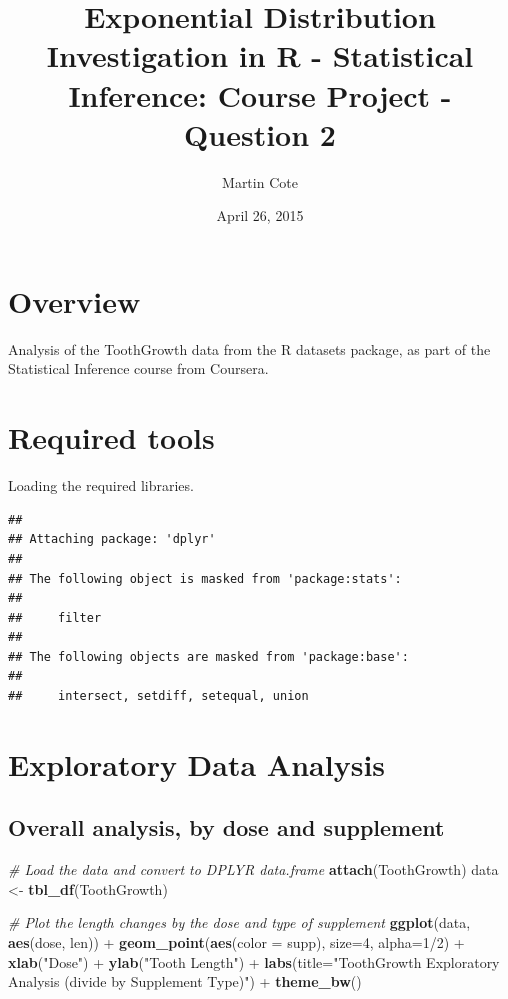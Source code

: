 \documentclass[]{article}
\title{Exponential Distribution Investigation in R - Statistical Inference:
Course Project - Question 2}
\author{Martin Cote}
\date{April 26, 2015}
\newenvironment{Shaded}{\begin{snugshade}}{\end{snugshade}}
\newcommand{\KeywordTok}[1]{\textcolor[rgb]{0.13,0.29,0.53}{\textbf{{#1}}}}
\newcommand{\DataTypeTok}[1]{\textcolor[rgb]{0.13,0.29,0.53}{{#1}}}
\newcommand{\DecValTok}[1]{\textcolor[rgb]{0.00,0.00,0.81}{{#1}}}
\newcommand{\StringTok}[1]{\textcolor[rgb]{0.31,0.60,0.02}{{#1}}}
\newcommand{\CommentTok}[1]{\textcolor[rgb]{0.56,0.35,0.01}{\textit{{#1}}}}
\newcommand{\NormalTok}[1]{{#1}}
\begin{document}
\maketitle


\section{Overview}\label{overview}

Analysis of the ToothGrowth data from the R datasets package, as part of
the Statistical Inference course from Coursera.

\section{Required tools}\label{required-tools}

Loading the required libraries.

\begin{verbatim}
## 
## Attaching package: 'dplyr'
## 
## The following object is masked from 'package:stats':
## 
##     filter
## 
## The following objects are masked from 'package:base':
## 
##     intersect, setdiff, setequal, union
\end{verbatim}

\section{Exploratory Data Analysis}\label{exploratory-data-analysis}

\subsection{Overall analysis, by dose and
supplement}\label{overall-analysis-by-dose-and-supplement}

\begin{Shaded}
\begin{Highlighting}[]
\CommentTok{# Load the data and convert to DPLYR data.frame}
\KeywordTok{attach}\NormalTok{(ToothGrowth)}
\NormalTok{data <-}\StringTok{ }\KeywordTok{tbl_df}\NormalTok{(ToothGrowth)}

\CommentTok{# Plot the length changes by the dose and type of supplement}
\KeywordTok{ggplot}\NormalTok{(data, }\KeywordTok{aes}\NormalTok{(dose, len)) +}
\StringTok{  }\KeywordTok{geom_point}\NormalTok{(}\KeywordTok{aes}\NormalTok{(}\DataTypeTok{color =} \NormalTok{supp), }\DataTypeTok{size=}\DecValTok{4}\NormalTok{, }\DataTypeTok{alpha=}\DecValTok{1}\NormalTok{/}\DecValTok{2}\NormalTok{) +}
\StringTok{  }\KeywordTok{xlab}\NormalTok{(}\StringTok{"Dose"}\NormalTok{) +}
\StringTok{  }\KeywordTok{ylab}\NormalTok{(}\StringTok{"Tooth Length"}\NormalTok{) +}
\StringTok{  }\KeywordTok{labs}\NormalTok{(}\DataTypeTok{title=}\StringTok{"ToothGrowth Exploratory Analysis (divide by Supplement Type)"}\NormalTok{) +}
\StringTok{  }\KeywordTok{theme_bw}\NormalTok{()}
\end{Highlighting}
\end{Shaded}
\end{document}
